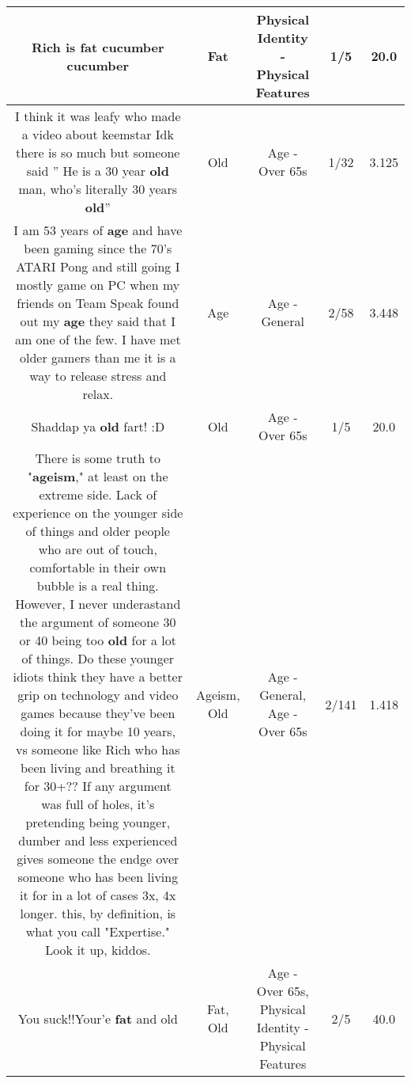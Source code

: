 \documentclass[11pt]{article}
\newlength\mylength
\begin{document}
\begin{center}
\begin{longtable}{|C{.65\mylength}|C{.30\mylength}|C{.12\mylength}|C{.12\mylength}|C{.12\mylength}|}
  \small Rich is \textbf{fat} cucumber cucumber\normalsize   & Fat & Physical Identity - Physical Features & 1/5 & 20.0 \\  \hline
  \small I think it was leafy who made a video about keemstar Idk there is so much but someone said '' He is a 30 year \textbf{old} man, who's literally 30 years \textbf{old}''\normalsize   & Old & Age - Over 65s & 1/32 & 3.125 \\  \hline
  \small I am 53 years of \textbf{age} and have been gaming since the 70's ATARI Pong and still going I mostly game on PC when my friends on Team Speak found out my \textbf{age} they said that I am one of the few. I have met older gamers than me it is a way to release stress and relax.\normalsize   & Age & Age - General & 2/58 & 3.448 \\  \hline
  \small Shaddap ya \textbf{old} fart! :D\normalsize   & Old & Age - Over 65s & 1/5 & 20.0 \\  \hline
  \small There is some truth to "\textbf{ageism}," at least on the extreme side. Lack of experience on the younger side of things and older people who are out of touch, comfortable in their own bubble is a real thing. However, I never underastand the argument of someone 30 or 40 being too \textbf{old} for a lot of things. Do these younger idiots think they have a better grip on technology and video games because they've been doing it for maybe 10 years, vs someone like Rich who has been living and breathing it for 30+?? If any argument was full of holes, it's pretending being younger, dumber and less experienced gives someone the endge over someone who has been living it for in a lot of cases 3x, 4x longer. this, by definition, is what you call "Expertise." Look it up, kiddos.\normalsize   & Ageism, Old & Age - General, Age - Over 65s & 2/141 & 1.418 \\  \hline
  \small You suck!!Your'e \textbf{fat} and old\normalsize   & Fat, Old & Age - Over 65s, Physical Identity - Physical Features & 2/5 & 40.0 \\  \hline

\end{longtable}
\end{center}
\end{document}
